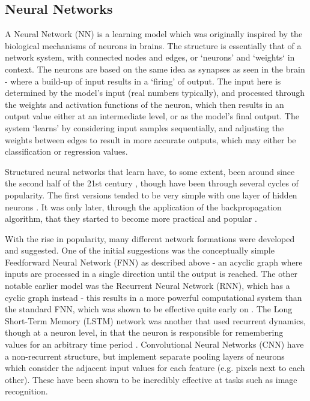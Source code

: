\documentclass[a4paper,11pt,oneside]{article}
\theoremstyle{plain}
\theoremstyle{definition}
\begin{document}
	\subsection{Neural Networks}\label{lr_nn}
	
	A Neural Network (NN) is a learning model which was originally inspired by the biological mechanisms of neurons 
	in brains. The structure is essentially that of a network system, with connected nodes and edges, or `neurons’ and 
	‘weights‘ in context. The neurons are based on the same idea as synapses as seen in the brain - where a build-up 
	of input results in a ‘firing’ of output. The input here is determined by the model's input (real numbers typically), 
	and processed through the weights and activation functions of the neuron, which then results in an output value 
	either at an intermediate level, or as the model's final output. The system ‘learns’ by considering input samples 
	sequentially, and adjusting the weights between edges to result in more accurate outputs, which may either be 
	classification or regression values. 
	\hfill \break 
	
	Structured neural networks that learn have, to some extent, been around since the second half of the 21st 
	century \citep{Schmidhuber}, though have been through several cycles of popularity. The first versions tended to be very simple 
	with one layer of hidden neurons \citep{Ivakhnenko}. It was only later, through the application of 
	the backpropagation algorithm, that they started to become more practical and popular \citep{Werbos}.
	\hfill \break 
	
	With the rise in popularity, many different network formations were developed and suggested. One of the initial 
	suggestions was the conceptually simple Feedforward Neural Network (FNN) as described above - an acyclic
	graph where inputs are processed in a single direction until the output is reached. The other notable earlier model 
	was the Recurrent Neural Network (RNN), which has a cyclic graph instead - this results in a more powerful 
	computational system than the standard FNN, which was shown to be effective quite early on 
	\citep{Siegelmann}. The Long Short-Term Memory (LSTM) network was 
	another that used recurrent dynamics, though at a neuron level, in that the neuron is responsible for remembering 
	values for an arbitrary time period \citep{Hochreiter}. Convolutional Neural Networks (CNN) have a non-recurrent structure, 
	but implement separate pooling layers of neurons which consider the adjacent input values for each feature 
	(e.g. pixels next to each other). These have been shown to be incredibly effective at tasks such as image 
	recognition.
	\hfill \break 
	
\end{document}
